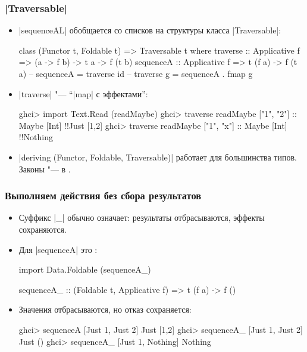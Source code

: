 \documentclass[11pt]{beamer}
\begin{document}
\begin{frame}[fragile]
  \frametitle{\haskinline|Traversable|}
  \begin{itemize}
    \item \haskinline|sequenceAL| обобщается со списков на структуры класса \haskinline|Traversable|:
          \begin{haskelltiny}
            class (Functor t, Foldable t) => Traversable t where
              traverse  :: Applicative f => (a -> f b) -> t a -> f (t b)
              sequenceA :: Applicative f => t (f a) -> f (t a)
              -- sequenceA  = \pause{} traverse id
              -- traverse g = \pause{} sequenceA . fmap g
          \end{haskelltiny}
          \pause
    \item \haskinline|traverse| "--- \enquote{\haskinline|map| с эффектами}:
          \begin{haskellsmall}
            ghci> import Text.Read (readMaybe)
            ghci> traverse readMaybe ["1", "2"] :: Maybe [Int]
            !\pause!Just [1,2]
            ghci> traverse readMaybe ["1", "x"] :: Maybe [Int]
            !\pause!Nothing
          \end{haskellsmall}
          \pause
    \item \haskinline|deriving (Functor, Foldable, Traversable)| работает для большинства типов. Законы "--- в \href{https://hackage.haskell.org/package/base/docs/Data-Traversable.html}{}.
  \end{itemize}
\end{frame}

\begin{frame}[fragile]
  \frametitle{Выполняем действия без сбора результатов}
  \begin{itemize}
    \item Суффикс \haskinline|_| обычно означает: результаты отбрасываются, эффекты сохраняются.
    \item Для \haskinline|sequenceA| это \href{https://hackage.haskell.org/package/base/docs/Data-Foldable.html#v:sequenceA_}{}:
          \begin{haskellsmall}
            import Data.Foldable (sequenceA_)

            sequenceA_ :: (Foldable t, Applicative f) =>
              t (f a) -> f ()
          \end{haskellsmall}
          \pause
    \item Значения отбрасываются, но отказ сохраняется:
          \begin{haskellsmall}
            ghci> sequenceA [Just 1, Just 2]
            Just [1,2]
            ghci> sequenceA_ [Just 1, Just 2]
            Just ()
            ghci> sequenceA_ [Just 1, Nothing]
            Nothing
          \end{haskellsmall}
  \end{itemize}
\end{frame}
\end{document}
